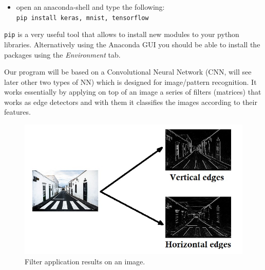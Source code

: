 \documentclass[11pt]{article}
\providecommand{\tightlist}{%
      \setlength{\itemsep}{0pt}\setlength{\parskip}{0pt}}
\begin{document}
\begin{itemize}
\tightlist
\item
  open an anaconda-shell and type the following:
  \texttt{pip\ install\ keras,\ mnist,\ tensorflow}
\end{itemize}

\texttt{pip} is a very useful tool that allows to install new modules to
your python libraries. Alternatively using the Anaconda GUI you should be
able to install the packages using the \emph{Environment} tab.

Our program will be based on a Convolutional Neural Network (CNN, will
see later other two types of NN) which is designed for image/pattern
recognition. It works essentially by applying on top of an image a
series of filters (matrices) that works as edge detectors and with them
it classifies the images according to their features.

\begin{figure}
  \centering
  \includegraphics{edges.jpg}
  \caption{Filter application results on an image.}
\end{figure}
\end{document}
